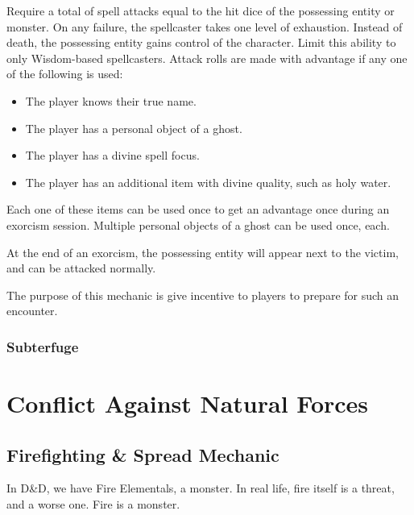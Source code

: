 \documentclass[twocolumn]{dndbook}
\begin{document}

Require a total of spell attacks equal to the hit dice of the possessing entity or monster.
On any failure, the spellcaster takes one level of exhaustion. Instead of death, the possessing entity gains control of the character.
Limit this ability to only Wisdom-based spellcasters. %
Attack rolls are made with advantage if any one of the following is used:
\begin{itemize}
	\item The player knows their true name.
	\item The player has a personal object of a ghost.
	\item The player has a divine spell focus.
	\item The player has an additional item with divine quality, such as holy water.
\end{itemize}

Each one of these items can be used once to get an advantage once during an exorcism session.
Multiple personal objects of a ghost can be used once, each.

At the end of an exorcism, the possessing entity will appear next to the victim, and can be attacked normally.\par

The purpose of this mechanic is give incentive to players to prepare for such an encounter.\par


\subsection{Subterfuge}


\chapter{Conflict Against Natural Forces}
\section{Firefighting \& Spread Mechanic}

In D\&D, we have Fire Elementals, a monster.
In real life, fire itself is a threat, and a worse one.
Fire is a monster.\par
\end{document}
